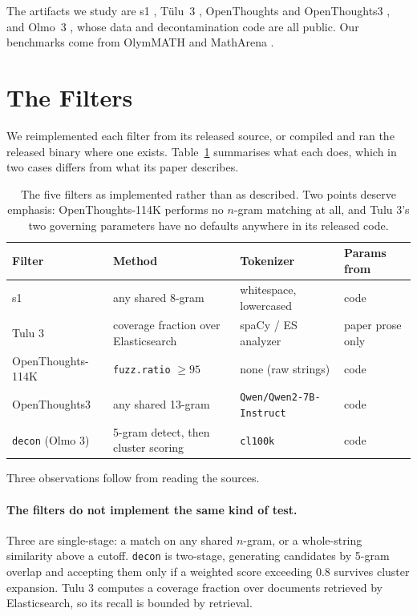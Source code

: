 \documentclass[11pt]{article}
\begin{document}
The artifacts we study are s1 \citep{s1}, T\"{u}lu~3 \citep{tulu3}, OpenThoughts
and OpenThoughts3 \citep{openthoughts}, and Olmo~3 \citep{olmo3}, whose data and
decontamination code are all public. Our benchmarks come from OlymMATH
\citep{olymmath} and MathArena \citep{matharena}.

\section{The Filters}
\label{sec:filters}

We reimplemented each filter from its released source, or compiled and ran the
released binary where one exists. Table~\ref{tab:filters} summarises what each
does, which in two cases differs from what its paper describes.

\begin{table}[t]
\centering
\small
\begin{tabular}{llll}
\toprule
\textbf{Filter} & \textbf{Method} & \textbf{Tokenizer} & \textbf{Params from} \\
\midrule
s1 & any shared 8-gram & whitespace, lowercased & code \\
Tulu 3 & coverage fraction over Elasticsearch & spaCy / ES analyzer & paper prose only \\
OpenThoughts-114K & \texttt{fuzz.ratio} $\geq 95$ & none (raw strings) & code \\
OpenThoughts3 & any shared 13-gram & \texttt{Qwen/Qwen2-7B-Instruct} & code \\
\texttt{decon} (Olmo 3) & 5-gram detect, then cluster scoring & \texttt{cl100k} & code \\
\bottomrule
\end{tabular}
\caption{The five filters as implemented rather than as described. Two points
deserve emphasis: OpenThoughts-114K performs no $n$-gram matching at all, and
Tulu 3's two governing parameters have no defaults anywhere in its released code.}
\label{tab:filters}
\end{table}

Three observations follow from reading the sources.

\paragraph{The filters do not implement the same kind of test.}
Three are single-stage: a match on any shared $n$-gram, or a whole-string
similarity above a cutoff. \texttt{decon} is two-stage, generating candidates by
5-gram overlap and accepting them only if a weighted score exceeding $0.8$
survives cluster expansion. Tulu 3 computes a coverage fraction over documents
retrieved by Elasticsearch, so its recall is bounded by retrieval.
\end{document}
